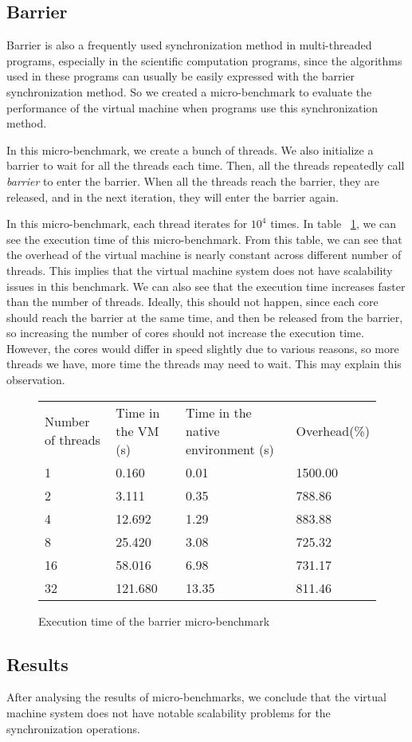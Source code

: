 \subsection{Barrier}
Barrier is also a frequently used synchronization method in multi-threaded
programs, especially in the scientific computation programs, since the
algorithms used in these programs can usually be easily expressed with the
barrier synchronization method. So we created a micro-benchmark to evaluate
the performance of the virtual machine when programs use this synchronization
method.

In this micro-benchmark, we create a bunch of threads. We also initialize
a barrier to wait for all the threads each time. Then, all the threads
repeatedly call {\em barrier} to enter the barrier. When all the threads
reach the barrier, they are released, and in the next iteration, they will
enter the barrier again.

In this micro-benchmark, each thread iterates for $10^4$ times.
In table ~\ref{fig:barrier}, we can see the execution time of this micro-benchmark.
From this table, we can see that the overhead of the virtual machine is nearly
constant across different number of threads. This implies that the virtual
machine system does not have scalability issues in this benchmark.
We can also see that the execution time increases faster than the number of
threads. Ideally, this should not happen, since each core should reach the
barrier at the same time, and then be released from the barrier, so increasing
the number of cores should not increase the execution time. However, the cores
would differ in speed slightly due to various reasons, so more threads we have, 
more time the threads may need to wait. This may explain this observation.

\begin{figure}[here]
\begin{tabular}{  l | l | l | l }
	Number of threads & Time in the VM (s) & Time in the native environment (s) & Overhead(\%) \\
	1 & 0.160 & 0.01 & 1500.00 \\
	2 & 3.111 & 0.35 & 788.86 \\
	4 & 12.692 & 1.29 & 883.88 \\
	8 & 25.420 & 3.08 & 725.32 \\
	16 & 58.016 & 6.98 & 731.17 \\
	32 & 121.680 & 13.35 & 811.46 \\
\end{tabular}
\caption{Execution time of the barrier micro-benchmark}
\label{fig:barrier}
\end{figure}

\subsection{Results}
After analysing the results of micro-benchmarks, we conclude that the virtual
machine system does not have notable scalability problems for the
synchronization operations.

